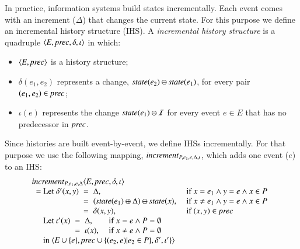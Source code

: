 \documentclass{elsarticle}
\def\id#1{\text{\it #1\/}}
\def\Events{{\mathit E}}
\begin{document}
	In practice, information systems build states incrementally.
	Each event comes with an increment ($\Delta$) that changes the current state.
	For this purpose we define an incremental history structure (IHS).
	A {\em incremental history structure} is a quadruple $\la\Events, \id{prec}, \delta, \iota\ra$ in which:
\begin{itemize}
\item	$\la \Events, \id{prec}\ra$ is a history structure;
\item	$\delta(e_1,e_2)$ represents a change, $\id{state}(e_2)\ominus\id{state}(e_1)$, for every pair $(e_1,e_2)\in\id{prec}$;
\item	$\iota(e)$ represents the change $\id{state}(e_1)\ominus\mathcal I$ for every event $e\in\Events$ that has no predecessor in $\id{prec}$.
\end{itemize}
	Since histories are built event-by-event, we define IHSs incrementally.
	For that purpose we use the following mapping, $\id{increment}_{P,e_1,e,\Delta,\iota}$,
	which adds one event ($e$) to an IHS:
\begin{eqnarray}
\begin{array}{l@{}l}
	\multicolumn{2}{l}{\id{increment}_{P,e_1,e,\Delta}\la\Events, \id{prec}, \delta, \iota\ra}\\
	\ \ =\ &\begin{array}[t]{@{}l@{\hspace{0.2cm}}c@{\hspace{0.2cm}}ll}
		\text{Let }\delta'(x,y)&=&\Delta\text{, }&\text{if }x=e_1\wedge y=e\wedge x\in P\\
				       &=&(\id{state}(e_1)\oplus\Delta)\ominus\id{state}(x)\text{, }&\text{if }x\neq e_1\wedge y=e\wedge x\in P\\
				       &=&\delta(x,y)\text{, }&\text{if }(x,y)\in\id{prec}
		\end{array}\\
		&\begin{array}[t]{@{}l@{\hspace{0.2cm}}c@{\hspace{0.2cm}}ll}
			\text{Let }\iota'(x)&=&\Delta\text{, }&\text{if }x=e\wedge P=\emptyset\\
				    &=&\iota(x)\text{, }&\text{if }x\neq e\wedge P=\emptyset
		\end{array}\\
		&\text{in }\la\Events\cup\{e\}, \id{prec}\cup\{(e_2,e)|e_2\in P\}, \delta', \iota'\}\ra
\end{array}
\label{req:increment}
\end{eqnarray}
\end{document}
